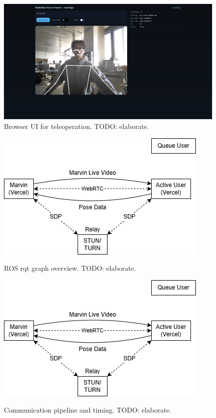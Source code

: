 \documentclass[manuscript,screen]{acmart} %
\begin{document}
\begin{figure}[htbp]
  \centering
  \includegraphics[width=\linewidth]{assets/web-ui}
  \caption{Browser UI for teleoperation. TODO: elaborate.} %
  \label{fig:ui}
\end{figure}

\begin{figure}[htbp]
  \centering
  \includegraphics[width=\linewidth]{assets/system-diagram}
  \caption{ROS rqt graph overview. TODO: elaborate.} %
  \label{fig:system}
\end{figure}

\begin{figure}[htbp]
  \centering
  \includegraphics[width=\linewidth]{assets/system-diagram.png}
  \caption{Communication pipeline and timing. TODO: elaborate.} %
  \label{fig:pipeline}
\end{figure}
\end{document}
